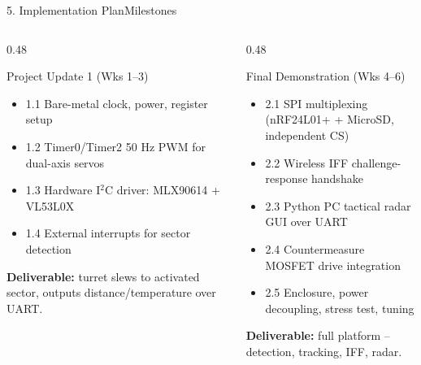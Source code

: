 \documentclass[aspectratio=169, 10pt]{beamer}
\begin{document}
\begin{frame}{5. Implementation Plan}{Milestones}
    \begin{columns}[T]
        \begin{column}{0.48\textwidth}
            \begin{block}{Project Update 1 (Wks 1--3)}
                \footnotesize
                \begin{itemize}
                    \item 1.1 Bare-metal clock, power, register setup
                    \item 1.2 Timer0/Timer2 50 Hz PWM for dual-axis servos
                    \item 1.3 Hardware I$^2$C driver: MLX90614 + VL53L0X
                    \item 1.4 External interrupts for sector detection
                \end{itemize}
                \textbf{Deliverable:} turret slews to activated sector, outputs distance/temperature over UART.
            \end{block}
        \end{column}
        \begin{column}{0.48\textwidth}
            \begin{block}{Final Demonstration (Wks 4--6)}
                \footnotesize
                \begin{itemize}
                    \item 2.1 SPI multiplexing (nRF24L01+ + MicroSD, independent CS)
                    \item 2.2 Wireless IFF challenge-response handshake
                    \item 2.3 Python PC tactical radar GUI over UART
                    \item 2.4 Countermeasure MOSFET drive integration
                    \item 2.5 Enclosure, power decoupling, stress test, tuning
                \end{itemize}
                \textbf{Deliverable:} full platform -- detection, tracking, IFF, radar.
            \end{block}
        \end{column}
    \end{columns}
\end{frame}
\end{document}
